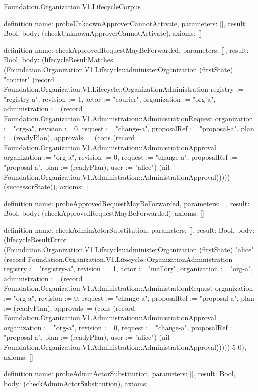 \begin{lexlean}{Foundation.Organization.V1.LifecycleCorpus}
\begin{semanticmodule}
definition{
  name: probeUnknownApproverCannotActivate,
  parameters: [],
  result: Bool,
  body: (checkUnknownApproverCannotActivate),
  axioms: []
}

definition{
  name: checkApprovedRequestMayBeForwarded,
  parameters: [],
  result: Bool,
  body: (lifecycleResultMatches (Foundation.Organization.V1.Lifecycle::administerOrganization (firstState) "courier" (record Foundation.Organization.V1.Lifecycle::OrganizationAdministration {registry := "registry-a", revision := 1, actor := "courier", organization := "org-a", administration := (record Foundation.Organization.V1.Administration::AdministrationRequest {organization := "org-a", revision := 0, request := "change-a", proposalRef := "proposal-a", plan := (readyPlan), approvals := (cons (record Foundation.Organization.V1.Administration::AdministrationApproval {organization := "org-a", revision := 0, request := "change-a", proposalRef := "proposal-a", plan := (readyPlan), user := "alice"}) (nil Foundation.Organization.V1.Administration::AdministrationApproval))})})) (successorState)),
  axioms: []
}

definition{
  name: probeApprovedRequestMayBeForwarded,
  parameters: [],
  result: Bool,
  body: (checkApprovedRequestMayBeForwarded),
  axioms: []
}

definition{
  name: checkAdminActorSubstitution,
  parameters: [],
  result: Bool,
  body: (lifecycleResultError (Foundation.Organization.V1.Lifecycle::administerOrganization (firstState) "alice" (record Foundation.Organization.V1.Lifecycle::OrganizationAdministration {registry := "registry-a", revision := 1, actor := "mallory", organization := "org-a", administration := (record Foundation.Organization.V1.Administration::AdministrationRequest {organization := "org-a", revision := 0, request := "change-a", proposalRef := "proposal-a", plan := (readyPlan), approvals := (cons (record Foundation.Organization.V1.Administration::AdministrationApproval {organization := "org-a", revision := 0, request := "change-a", proposalRef := "proposal-a", plan := (readyPlan), user := "alice"}) (nil Foundation.Organization.V1.Administration::AdministrationApproval))})})) 5 0),
  axioms: []
}

definition{
  name: probeAdminActorSubstitution,
  parameters: [],
  result: Bool,
  body: (checkAdminActorSubstitution),
  axioms: []
}


\end{semanticmodule}
\end{lexlean}
